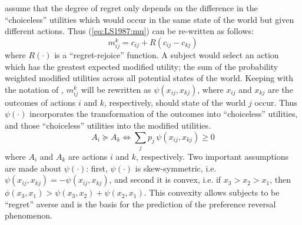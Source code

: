 \documentclass[../main.tex]{subfiles}
\begin{document}
\textcite[809]{Loomes1987} assume that the degree of regret only depends on the difference in the \enquote{choiceless} utilities which would occur in the same state of the world but given different actions.
Thus (\ref{eq:LS1987:mu}) can be re-written as follows:
\begin{equation}
	\label{eq:LS1987:mu2}
	m^k_{ij} = c_{ij} + R(c_{ij} - c_{kj})
\end{equation}
\noindent where $R(\cdot)$ is a \enquote{regret-rejoice} function. 
A subject would select an action which has the greatest expected modified utility; the sum of the probability weighted modified utilities across all potential states of the world.
Keeping with the notation of \textcite{Loomes1989}, $m^k_{ij}$ will be rewritten as $\psi(x_{ij}, x_{kj})$, where $x_{ij}$ and $x_{kj}$ are the outcomes of actions $i$ and $k$, respectively, should state of the world $j$ occur.
Thus $\psi(\cdot)$ incorporates the transformation of the outcomes into \enquote{choiceless} utilities, and those \enquote{choiceless} utilities into the modified utilities.
\begin{equation}
	\label{eq:LSS1989:mu3}
	A_i \succcurlyeq  A_k \Leftrightarrow \sum_{j} p_j \, \psi ( x_{ij} , x_{kj} ) \geq  0
\end{equation}
\noindent where $A_i$ and $A_k$ are actions $i$ and $k$, respectively.
Two important assumptions are made about $\psi(\cdot)$: first, $\psi(\cdot)$ is skew-symmetric, i.e. $\psi(x_{ij},x_{kj}) = -\psi(x_{ij},x_{kj})$, and second it is convex, i.e. if $x_3 > x_2 > x_1$, then $\phi(x_3,x_1) > \psi(x_3,x_2) + \psi(x_2,x_1)$.
This convexity allows subjects to be \enquote{regret} averse and is the basis for the prediction of the preference reversal phenomenon.
\end{document}
